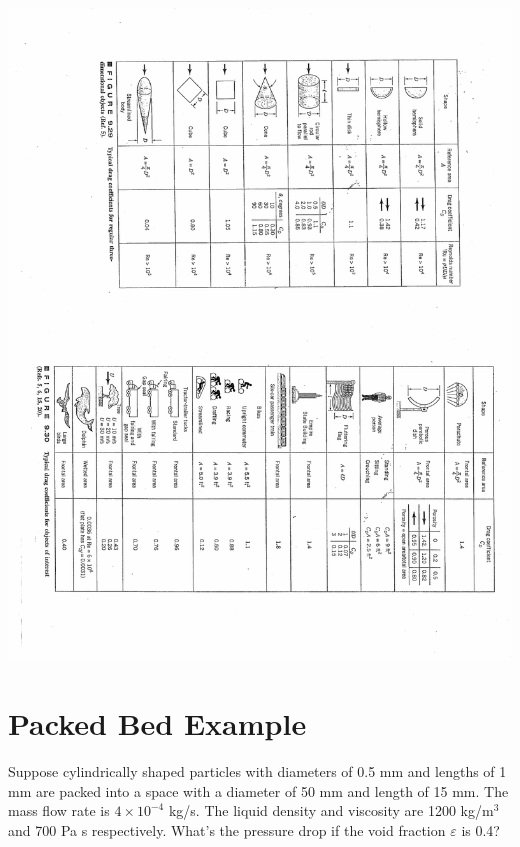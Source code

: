 \documentclass[paper=a4, fontsize=12pt]{scrartcl} %
\numberwithin{equation}{section} %
\numberwithin{figure}{section} %
\numberwithin{table}{section} %
\begin{document}
  \includegraphics[scale=0.80]{Munsonfigure94Part2.pdf}
  
   \newpage

 \section*{Packed Bed Example}

Suppose cylindrically shaped particles with diameters of 0.5 mm and lengths of 1 mm are packed into a space with a diameter of 50 mm and length of 15 mm. The mass flow rate is $4 \times 10^{-4}$ kg/s. The liquid density and viscosity are 1200 kg/m$^3$ and 700 Pa s respectively. What's the pressure drop if the void fraction $\varepsilon$ is 0.4?
\end{document}
